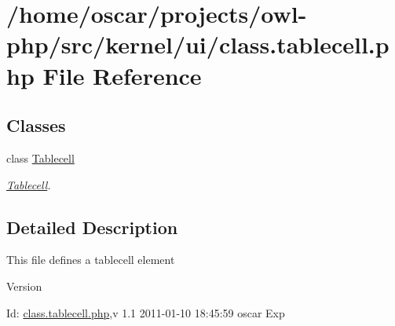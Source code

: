 \section{/home/oscar/projects/owl-\/php/src/kernel/ui/class.tablecell.php File Reference}
\label{class_8tablecell_8php}
\subsection*{Classes}
\begin{DoxyCompactItemize}
\item 
class \hyperlink{classTablecell}{Tablecell}
\begin{DoxyCompactList}\small\item\em \hyperlink{classTablecell}{Tablecell}. \item\end{DoxyCompactList}\end{DoxyCompactItemize}


\subsection{Detailed Description}
This file defines a tablecell element \begin{DoxyVersion}{Version}

\end{DoxyVersion}
\begin{DoxyParagraph}{Id:}
\hyperlink{class_8tablecell_8php}{class.tablecell.php},v 1.1 2011-\/01-\/10 18:45:59 oscar Exp 
\end{DoxyParagraph}
